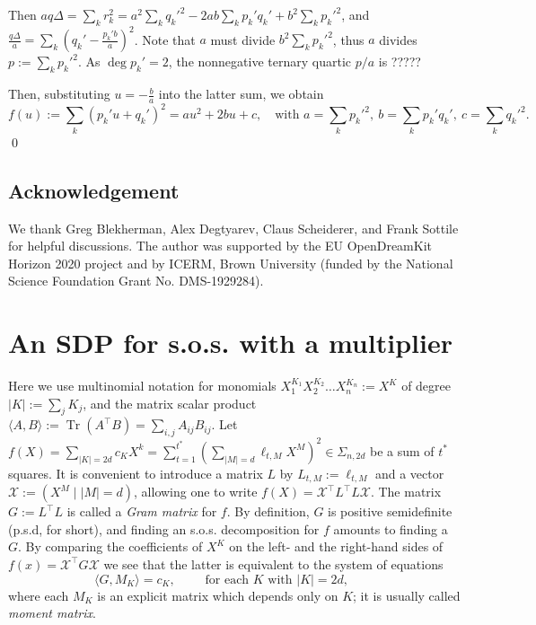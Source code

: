 \documentclass[a4paper,twoside,reqno]{amsart}
\DeclareMathOperator{\Tr}{Tr}
\newcommand{\SosHF}[2]{\Sigma_{{#2},{#1}}}
\theoremstyle{plain}
\theoremstyle{definition}
\theoremstyle{remark}
\begin{document}
Then $aq\Delta=\sum_k r_k^2=a^2\sum_{k}q_k'^2-2ab\sum_k p_k' q_k'+b^2\sum_k p_k'^2$, and
$\frac{q\Delta}{a}=\sum_k (q_k'-\frac{p_k'b}{a})^2$.
Note that $a$ must divide $b^2\sum_k p_k'^2$, thus $a$ divides $p:=\sum_k p_k'^2$.
As $\deg p_k'=2$, the nonnegative ternary quartic $p/a$ is ?????

Then, substituting  $u=-\frac{b}{a}$ into the latter sum, we obtain
\begin{equation}\label{eq:fdeltaprime}
f(u):=\sum_k(p_k'u+q_k')^2=au^2+2bu+c, \quad\text{with }
a=\sum_k p_k'^2,\ b=\sum_k p_k' q_k',\ c=\sum_k q_k'^2.
\end{equation}
\qed
\fi

\subsection*{Acknowledgement} We thank Greg Blekherman, Alex Degtyarev, Claus Scheiderer, and Frank Sottile for helpful discussions.
The author was supported by the EU OpenDreamKit Horizon 2020 project and by ICERM, Brown University (funded by the National Science Foundation Grant No. DMS-1929284).




\appendix
\section{An SDP for s.o.s. with a multiplier}\label{app:A}
Here we use multinomial notation for
monomials $X_1^{K_1}X_2^{K_2}\dots X_n^{K_n}:=X^K$
of degree $|K|:=\sum_j K_j$,
and the matrix scalar product $\langle A,B\rangle:=\Tr(A^\top B)=\sum\limits_{i,j}A_{ij}B_{ij}$.
Let $f(X)=\sum\limits_{|K|=2d}c_K X^k=\sum\limits_{t=1}^{t^*} (\sum\limits_{|M|=d} \ell_{t,M}X^M)^2\in\SosHF{2d}{n}$ be a sum of $t^*$ squares.
It is convenient to introduce a matrix $L$ by $L_{t,M}:=\ell_{t,M}$ and a vector $\mathcal{X}:=(X^M\mid |M|=d)$, allowing
one to write $f(X)=\mathcal{X}^\top L^\top L\mathcal{X}$. The matrix $G:=L^\top L$ is called a \emph{Gram matrix} for $f$.
By definition, $G$ is positive semidefinite (p.s.d, for short), and finding an s.o.s. decomposition for $f$ amounts to finding a $G$.
By comparing the coefficients of $X^K$ on the left- and the right-hand sides of $f(x)= \mathcal{X}^\top G\mathcal{X}$
we see that the latter is equivalent to the system of equations 
\begin{equation}\label{eq:gram}
\langle G,M_K\rangle =c_K,\qquad\text{ for each $K$ with $|K|=2d$},
\qquad
\end{equation}
where each $M_K$ is an explicit matrix which depends only on $K$; it is usually called \emph{moment matrix}.
\end{document}
